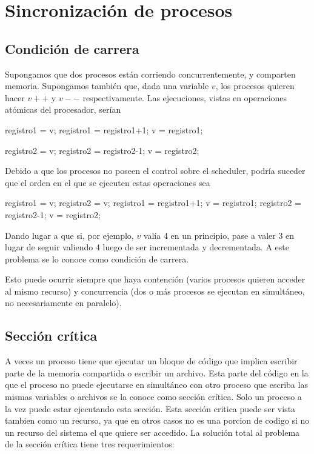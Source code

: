 \documentclass{article}
\begin{document}
\section{Sincronizaci\'on de procesos}

\subsection{Condici\'on de carrera}

Supongamos que dos procesos est\'an corriendo concurrentemente, y comparten memoria. Supongamos tambi\'en que, dada una variable $v$, los procesos quieren hacer $v++$ y $v--$ respectivamente. Las ejecuciones, vistas en operaciones at\'omicas del procesador, ser\'ian

\begin{code}
registro1 = v;
registro1 = registro1+1;
v = registro1;
\end{code}

\begin{code}
registro2 = v;
registro2 = registro2-1;
v = registro2;
\end{code}

Debido a que los procesos no poseen el control sobre el scheduler, podr\'ia suceder que el orden en el que se ejecuten estas operaciones sea

\begin{code}
registro1 = v;
registro2 = v;
registro1 = registro1+1;
v = registro1;
registro2 = registro2-1;
v = registro2;
\end{code}

Dando lugar a que si, por ejemplo, $v$ val\'ia 4 en un principio, pase a valer 3 en lugar de seguir valiendo 4 luego de ser incrementada y decrementada. A este problema se lo conoce como condici\'on de carrera.

Esto puede ocurrir siempre que haya contenci\'on (varios procesos quieren acceder al mismo recurso) y concurrencia (dos o m\'as procesos se ejecutan en simult\'aneo, no necesariamente en paralelo).

\subsection{Secci\'on cr\'itica}

A veces un proceso tiene que ejecutar un bloque de c\'odigo que implica escribir parte de la memoria compartida o escribir un archivo. Esta parte del c\'odigo en la que el proceso no puede ejecutarse en simult\'aneo con otro proceso que escriba las mismas variables o archivos se la conoce como secci\'on cr\'itica. Solo un proceso a la vez puede estar ejecutando esta sección. Esta sección critica puede ser vista tambien como un recurso, ya que en otros casos no es una porcion de codigo si no un recurso del sistema el que quiere ser accedido. La soluci\'on total al problema de la secci\'on cr\'itica tiene tres requerimientos:
\end{document}
